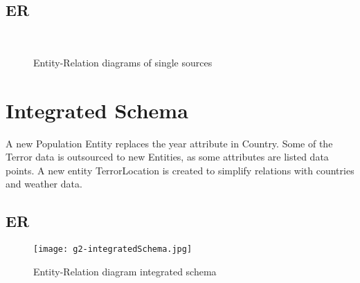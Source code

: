 \subsection{ER}
\begin{figure}[hbt!]
    \qquad
    \qquad
    \centering
    \qquad\\
    \centering
    \qquad
    \caption{Entity-Relation diagrams of single sources}
\label{fig:example subfigure}
\end{figure}




\section{Integrated Schema}
A new Population Entity replaces the year attribute in Country. Some of the Terror data is outsourced to new Entities, as some attributes are listed data points. A new entity TerrorLocation is created to simplify relations with countries and weather data.

\subsection{ER}
\begin{figure}[hbt!]
	\centering
	\texttt{[image: g2-integratedSchema.jpg]}
	\caption{Entity-Relation diagram integrated schema}
\end{figure}
    
